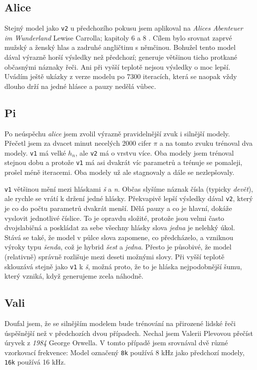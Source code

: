 \documentclass[a4]{article}
\begin{document}
\subsection{Alice}
Stejný model jako \verb|v2| u předchozího pokusu jsem aplikoval na \textit{Alices Abenteuer im Wunderland} Lewise Carrolla; kapitoly 6 a 8 \cite{alice}. Cílem bylo srovnat zaprvé mužský a ženský hlas a zadruhé angličtinu s němčinou. Bohužel tento model dával výrazně horší výsledky než předchozí; generuje většinou ticho protkané občasnými náznaky řeči. Ani při vyšší teplotě nejsou výsledky o moc lepší. Uvádím ještě ukázky z verze modelu po 7300 iteracích, která se naopak vždy dlouho drží na jedné hlásce a pauzy nedělá vůbec.

\subsection{Pi}
Po neúspěchu \textit{alice} jsem zvolil výrazně pravidelnější zvuk i silnější modely. Přečetl jsem za dvacet minut necelých 2000 cifer $\pi$ a na tomto zvuku trénoval dva modely. \verb|v1| má velké $h_n$, ale \verb|v2| má o vrstvu více. Oba modely jsem trénoval stejnou dobu a protože \verb|v1| má asi dvakrát víc parametrů a trénuje se pomaleji, prošel méně iteracemi. Oba modely už ale stagnovaly a dále se nezlepšovaly.

\verb|v1| většinou mění mezi hláskami \textit{š} a \textit{n}. Občas slyšíme náznak čísla (typicky \textit{devět}), ale rychle se vrátí k držení jedné hlásky.
Překvapivě lepší výsledky dával \verb|v2|, který je co do počtu parametrů dvakrát menší. Dělá pauzy a co je hlavní, dokáže vyslovit jednotlivé číslice. To je opravdu složité, protože jsou velmi často dvojslabičná a poskládat za sebe všechny hlásky slova \textit{jedna} je nelehký úkol. Stává se také, že model v půlce slova zapomene, co předcházelo, a vzniknou výroky typu \textit{šenda}, což je hybrid \textit{šest} a \textit{jedna}. Přesto je působivé, že model (relativně) správně rozlišuje mezi deseti možnými slovy.
Při vyšší teplotě sklouzává stejně jako \verb|v1| k \textit{š}, možná proto, že to je hláska nejpodobnější šumu, který vzniká, když generujeme zcela náhodně.

\subsection{Vali}
Doufal jsem, že se silnějším modelem bude trénování na přirozené lidské řeči úspěšnější než v předchozích dvou případech. Nechal jsem Valerii Plevovou přečíst úryvek z \textit{1984} George Orwella. V tomto případě jsem srovnával dvě různé vzorkovací frekvence: Model označený \verb|8k| používá 8 kHz jako předchozí modely, \verb|16k| používá 16 kHz.
\end{document}
